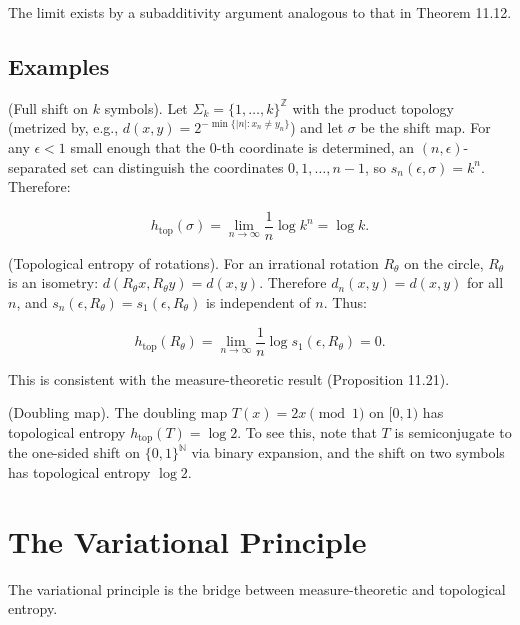 The limit exists by a subadditivity argument analogous to that in Theorem 11.12.

\subsection{Examples}\label{sec:11.7.3}

\begin{example}
(Full shift on $k$ symbols). Let $\Sigma_k = \{1, \ldots, k\}^{\mathbb{Z}}$ with the product topology (metrized by, e.g., $d(x,y) = 2^{-\min\{|n| : x_n \neq y_n\}}$) and let $\sigma$ be the shift map. For any $\epsilon < 1$ small enough that the $0$-th coordinate is determined, an $(n, \epsilon)$-separated set can distinguish the coordinates $0, 1, \ldots, n-1$, so $s_n(\epsilon, \sigma) = k^n$. Therefore:

\[
h_{\mathrm{top}}(\sigma) = \lim_{n \to \infty} \frac{1}{n} \log k^n = \log k.
\]
\end{example}


\begin{example}
(Topological entropy of rotations). For an irrational rotation $R_\theta$ on the circle, $R_\theta$ is an isometry: $d(R_\theta x, R_\theta y) = d(x,y)$. Therefore $d_n(x,y) = d(x,y)$ for all $n$, and $s_n(\epsilon, R_\theta) = s_1(\epsilon, R_\theta)$ is independent of $n$. Thus:

\[
h_{\mathrm{top}}(R_\theta) = \lim_{n \to \infty} \frac{1}{n}\log s_1(\epsilon, R_\theta) = 0.
\]

This is consistent with the measure-theoretic result (Proposition 11.21).
\end{example}


\begin{example}
(Doubling map). The doubling map $T(x) = 2x \pmod 1$ on $[0,1)$ has topological entropy $h_{\mathrm{top}}(T) = \log 2$. To see this, note that $T$ is semiconjugate to the one-sided shift on $\{0,1\}^{\mathbb{N}}$ via binary expansion, and the shift on two symbols has topological entropy $\log 2$.


\bigskip

\end{example}


\section{The Variational Principle}\label{sec:11.8}

The variational principle is the bridge between measure-theoretic and topological entropy.

